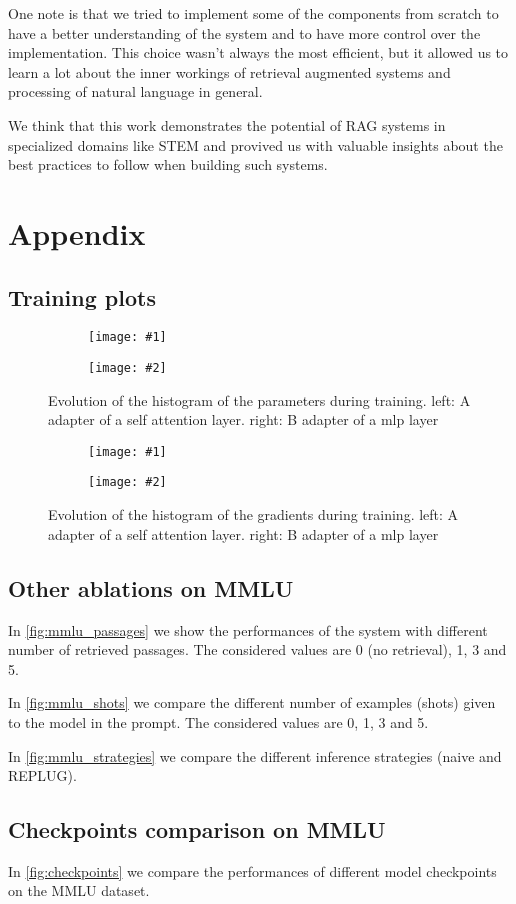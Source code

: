 \documentclass[11pt]{article}
\newcommand{\sideBySideImages}[5]{%
    \begin{figure}[ht]
        \centering
        \begin{subfigure}{#3\linewidth}
            \centering
            \texttt{[image: \#1]}
        \end{subfigure}%
        \hfill%
        \begin{subfigure}{#3\linewidth}
            \centering
            \texttt{[image: \#2]}
        \end{subfigure}
        \caption{#5}
        \label{#4}
    \end{figure}
}
\begin{document}
One note is that we tried to implement some of the components from scratch
to have a better understanding of the system and to have more control over the
implementation.
This choice wasn't always the most efficient, but it allowed us to learn a lot
about the inner workings of retrieval augmented systems and processing of natural 
language in general. 

We think that this work demonstrates the potential of RAG systems in specialized 
domains like STEM and provived us with valuable insights about the best practices 
to follow when building such systems.

\newpage



\nocite{*}

\appendix

\section{Appendix}
\label{sec:appendix}

\subsection{Training plots}

\sideBySideImages{figures/paramsA.png}{figures/paramsB.png}{0.48}{fig:params}{Evolution of the histogram of the parameters during training. left: A adapter of a self attention layer. right: B adapter of a mlp layer}

\sideBySideImages{figures/gradientsA.png}{figures/gradientsB.png}{0.48}{fig:gradients}{Evolution of the histogram of the gradients during training. left: A adapter of a self attention layer. right: B adapter of a mlp layer}

\subsection{Other ablations on MMLU}

In \ref{fig:mmlu_passages} we show the performances of the system with different 
number of retrieved passages. The considered values are 0 (no retrieval), 1, 3 and 5.

In \ref{fig:mmlu_shots} we compare the different number of examples (shots) given to
the model in the prompt. The considered values are 0, 1, 3 and 5.

In \ref{fig:mmlu_strategies} we compare the different inference strategies (naive and REPLUG).

\subsection{Checkpoints comparison on MMLU}

In \ref{fig:checkpoints} we compare the performances of different model checkpoints on the MMLU dataset.
\end{document}
